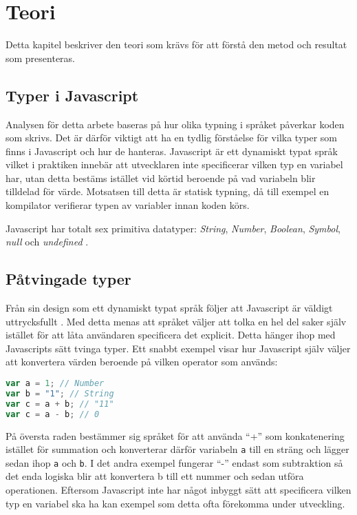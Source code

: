 \section{Teori}
\label{sec:alexander-theory}

Detta kapitel beskriver den teori som krävs för att förstå den metod och resultat som presenteras.

\subsection{Typer i Javascript}

Analysen för detta arbete baseras på hur olika typning i språket påverkar koden som skrivs. Det är därför viktigt att ha en tydlig förståelse för vilka typer som finns i Javascript och hur de hanteras. Javascript är ett dynamiskt typat språk vilket i praktiken innebär att utvecklaren inte specificerar vilken typ en variabel har, utan detta bestäms istället vid körtid beroende på vad variabeln blir tilldelad för värde. Motsatsen till detta är statisk typning, då till exempel en kompilator verifierar typen av variabler innan koden körs.

Javascript har totalt sex primitiva datatyper: \textit{String}, \textit{Number}, \textit{Boolean}, \textit{Symbol}, \textit{null} och \textit{undefined} \cite{javascript-primitives}.

\subsection{Påtvingade typer}

Från sin design som ett dynamiskt typat språk följer att Javascript är väldigt uttrycksfullt \cite{javascript-type-coersion}. Med detta menas att språket väljer att tolka en hel del saker själv istället för att låta användaren specificera det explicit. Detta hänger ihop med Javascripts sätt tvinga typer. Ett snabbt exempel visar hur Javascript själv väljer att konvertera värden beroende på vilken operator som används:

\begin{lstlisting}[language=JavaScript]
var a = 1; // Number
var b = "1"; // String
var c = a + b; // "11"
var c = a - b; // 0
\end{lstlisting}




På översta raden bestämmer sig språket för att använda ``+'' som konkatenering istället för summation och konverterar därför variabeln \texttt{a} till en sträng och lägger sedan ihop \texttt{a} och \texttt{b}. I det andra exempel fungerar ``-'' endast som subtraktion så det enda logiska blir att konvertera b till ett nummer och sedan utföra operationen. Eftersom Javascript inte har något inbyggt sätt att specificera vilken typ en variabel ska ha kan exempel som detta ofta förekomma under utveckling.

